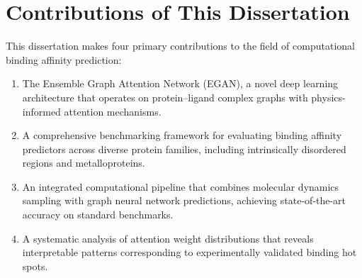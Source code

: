 \section{Contributions of This Dissertation}

This dissertation makes four primary contributions to the field of computational binding affinity prediction:

\begin{enumerate}[label=(\arabic*), leftmargin=*]
\item The Ensemble Graph Attention Network (EGAN), a novel deep learning architecture that operates on protein--ligand complex graphs with physics-informed attention mechanisms.
\item A comprehensive benchmarking framework for evaluating binding affinity predictors across diverse protein families, including intrinsically disordered regions and metalloproteins.
\item An integrated computational pipeline that combines molecular dynamics sampling with graph neural network predictions, achieving state-of-the-art accuracy on standard benchmarks.
\item A systematic analysis of attention weight distributions that reveals interpretable patterns corresponding to experimentally validated binding hot spots.
\end{enumerate}
